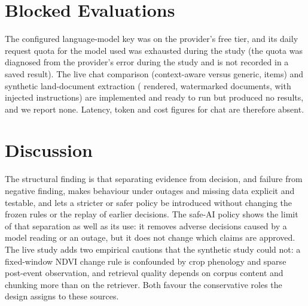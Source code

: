 \documentclass{ieeeaccess}
\begin{document}
\section{Blocked Evaluations}\label{sec:blocked}
The configured language-model key was on the provider's free tier, and its daily request quota for the model used was exhausted during the study (the quota was diagnosed from the provider's error during the study and is not recorded in a saved result). The live chat comparison (context-aware versus generic, \ChatLiveItems{} items) and synthetic land-document extraction (\LandDocsSynthetic{} rendered, watermarked documents, \LandDocsInjected{} with injected instructions) are implemented and ready to run but produced no results, and we report none. Latency, token and cost figures for chat are therefore absent.

\section{Discussion}
The structural finding is that separating evidence from decision, and failure from negative finding, makes behaviour under outages and missing data explicit and testable, and lets a stricter or safer policy be introduced without changing the frozen rules or the replay of earlier decisions. The safe-AI policy shows the limit of that separation as well as its use: it removes adverse decisions caused by a model reading or an outage, but it does not change which claims are approved. The live study adds two empirical cautions that the synthetic study could not: a fixed-window NDVI change rule is confounded by crop phenology and sparse post-event observation, and retrieval quality depends on corpus content and chunking more than on the retriever. Both favour the conservative roles the design assigns to these sources.
\end{document}
